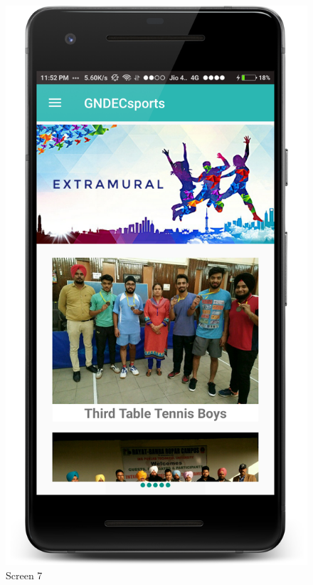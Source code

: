 \begin{figure}[ht]
\centering
\includegraphics[scale=0.13]{images/S7.png}
\caption{Screen 7}
\end{figure}

\newpage

